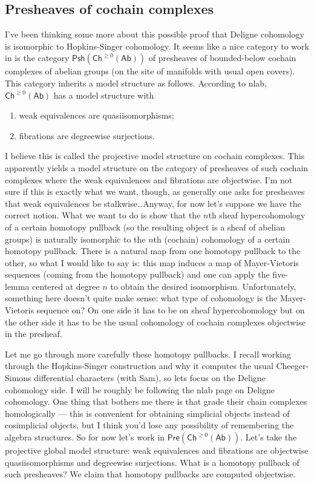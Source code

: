 \documentclass{amsart}
\begin{document}
\subsection{Presheaves of cochain complexes}
I've been thinking some more about this possible proof that Deligne cohomology
is isomorphic to Hopkins-Singer cohomology. It seems like a nice category
to work in is the category $\mathsf{Psh}(\mathsf{Ch}^{\geq 0}(\mathsf{Ab}))$ of
presheaves of bounded-below cochain complexes of abelian groups (on the site of
manifolds with usual open covers). This category inherits a model structure as
follows. According to nlab, $\mathsf{Ch}^{\geq 0}(\mathsf{Ab})$ has a model structure
with
\begin{enumerate}
    \item weak equivalences are quasiisomorphisms;
    \item fibrations are degreewise surjections.
\end{enumerate}
I believe this is called the projective model structure on cochain complexes.
This apparently yields a model structure on the category of presheaves
of such cochain complexes where the weak equivalences and fibrations are
objectwise. I'm not sure if this is exactly what we want, though, as generally
one asks for presheaves that weak equivalences be stalkwise\ldots Anyway,
for now let's suppose we have the correct notion. What we want to do is show
that the $n$th sheaf hypercohomology of a certain homotopy pullback (so the
resulting object is a sheaf of abelian groups) is naturally isomorphic to the $n$th
(cochain) cohomology of a certain homotopy pullback. There is a natural
map from one homotopy pullback to the other, so what I would like to
say is: this map induces a map of Mayer-Vietoris sequences (coming from the
homotopy pullback) and one can apply the five-lemma centered at degree $n$
to obtain the desired isomorphism. Unfortunately, something here doesn't quite make
sense: what type of cohomology is the Mayer-Vietoris sequence on? On one
side it has to be on sheaf hypercohomology but on the other side it has to be the
usual cohomology of cochain complexes objectwise in the presheaf.

Let me go through more carefully these homotopy pullbacks. I recall working through
the Hopkins-Singer construction and why it computes the usual Cheeger-Simons
differential characters (with Sam), so lets focus on the Deligne cohomology side.
I will be roughly be following the nlab page on Deligne cohomology. One thing that
bothers me there is that grade their chain complexes homologically --- this is
convenient for obtaining simplicial objects instead of cosimplicial objects,
but I think you'd lose any possibility of remembering the algebra structures.
So for now let's work in $\mathsf{Pre}(\mathsf{Ch}^{\geq 0}(\mathsf{Ab}))$.
Let's take the projective global model structure: weak equivalences and fibrations
are objectwise quasiisomorphisms and degreewise surjections. What is a homotopy
pullback of such presheaves? {\color{red} We claim that homotopy pullbacks are computed
objectwise.}
\end{document}

